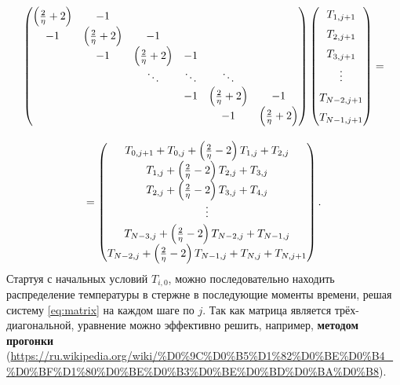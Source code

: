 \documentclass[12pt]{article}
\begin{document}
\begin{equation}
\begin{array}{c}
\begin{pmatrix}
\left(\frac{2}{\eta}+2\right) & -1 & \hphantom{1} & \hphantom{1} & \hphantom{1} & \hphantom{1}\\
-1 & \left(\frac{2}{\eta}+2\right) & -1 & \hphantom{1} & \hphantom{1} & \hphantom{1}\\
\hphantom{1} & -1 & \left(\frac{2}{\eta}+2\right) & -1 & \hphantom{1} & \hphantom{1}\\
\hphantom{1} & \hphantom{1} & \ddots & \ddots & \ddots & \hphantom{1}\\
\hphantom{1} & \hphantom{1} & \hphantom{1} & -1 & \left(\frac{2}{\eta}+2\right) & -1\\
\hphantom{1} & \hphantom{1} & \hphantom{1} & \hphantom{1} & -1 & \left(\frac{2}{\eta}+2\right)\\
\end{pmatrix}
\begin{pmatrix}
\vphantom{\left(\frac{2}{\eta}\right)} T_{1,j+1}\\
\vphantom{\left(\frac{2}{\eta}\right)} T_{2,j+1}\\
\vphantom{\left(\frac{2}{\eta}\right)} T_{3,j+1}\\
\vphantom{\left(\frac{2}{\eta}\right)} \vdots\\
\vphantom{\left(\frac{2}{\eta}\right)} T_{N-2,j+1}\\
\vphantom{\left(\frac{2}{\eta}\right)} T_{N-1,j+1}
\end{pmatrix}=\\
\hphantom{1111}\\
=\begin{pmatrix}
T_{0,j+1}+T_{0,j}+\left(\frac{2}{\eta}-2\right)T_{1,j}+T_{2,j}\\
T_{1,j}+\left(\frac{2}{\eta}-2\right)T_{2,j}+T_{3,j}\\
T_{2,j}+\left(\frac{2}{\eta}-2\right)T_{3,j}+T_{4,j}\\
\vphantom{\left(\frac{2}{\eta}\right)} \vdots\\
T_{N-3,j}+\left(\frac{2}{\eta}-2\right)T_{N-2,j}+T_{N-1,j}\\
T_{N-2,j}+\left(\frac{2}{\eta}-2\right)T_{N-1,j}+T_{N,j}+T_{N,j+1}
\end{pmatrix}.
\end{array}
\label{eq:matrix}
\end{equation}
%
Стартуя с начальных условий $T_{i,0}$, можно последовательно находить распределение температуры в стержне в последующие моменты времени, решая систему \eqref{eq:matrix} на каждом шаге по $j$. Так как матрица является трёх-диагональной, уравнение можно эффективно решить, например, \textbf{методом прогонки} (\url{https://ru.wikipedia.org/wiki/%D0%9C%D0%B5%D1%82%D0%BE%D0%B4_%D0%BF%D1%80%D0%BE%D0%B3%D0%BE%D0%BD%D0%BA%D0%B8}).
\end{document}
